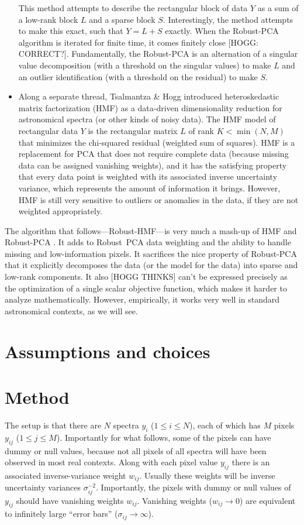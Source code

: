 \documentclass{article}
\begin{document}
\begin{itemize}
    This method attempts to describe the rectangular block of data $Y$ as a sum of a low-rank block $L$ and a sparse block $S$.
    Interestingly, the method attempts to make this exact, such that $Y=L+S$ exactly.
    When the Robust-PCA algorithm is iterated for finite time, it comes finitely close [HOGG: CORRECT?].
    Fundamentally, the Robust-PCA is an alternation of a singular value decomposition (with a threshold on the singular values) to make $L$ and an outlier identification (with a threshold on the residual) to make $S$.
    \item Along a separate thread, Tsalmantza \& Hogg introduced heteroskedastic matrix factorization (HMF) \cite{hmf} as a data-driven dimensionality reduction for astronomical spectra (or other kinds of noisy data).
    The HMF model of rectangular data $Y$ is the rectangular matrix $L$ of rank $K<\min(N,M)$ that minimizes the chi-squared residual (weighted sum of squares).
    HMF is a replacement for PCA that does not require complete data (because missing data can be assigned vanishing weights), and it has the satisfying property that every data point is weighted with its associated inverse uncertainty variance, which represents the amount of information it brings.
    However, HMF is still very sensitive to outliers or anomalies in the data, if they are not weighted appropriately.
\end{itemize}
The algorithm that follows---Robust-HMF---is very much a mash-up of HMF \cite{hmf} and Robust-PCA \cite{candes}.
It adds to Robust~PCA data weighting and the ability to handle missing and low-information pixels.
It sacrifices the nice property of Robust-PCA that it explicitly decomposes the data (or the model for the data) into sparse and low-rank components.
It also [HOGG THINKS] can't be expressed precisely as the optimization of a single scalar objective function, which makes it harder to analyze mathematically.
However, empirically, it works very well in standard astronomical contexts, as we will see.

\section{Assumptions and choices}

\section{Method}
The setup is that there are $N$ spectra $y_i$ ($1\leq i\leq N$),
each of which has $M$ pixels $y_{ij}$ ($1\leq j\leq M$).
Importantly for what follows, some of the pixels can have dummy or null values, because not all pixels of all spectra will have been observed in most real contexts.
Along with each pixel value $y_{ij}$ there is an associated inverse-variance weight $w_{ij}$.
Usually these weights will be inverse uncertainty variances $\sigma_{ij}^{-2}$.
Importantly, the pixels with dummy or null values of $y_{ij}$ should have vanishing weights $w_{ij}$.
Vanishing weights ($w_{ij}\rightarrow 0$) are equivalent to infinitely large ``error bars'' ($\sigma_{ij}\rightarrow\infty$).
\end{document}
